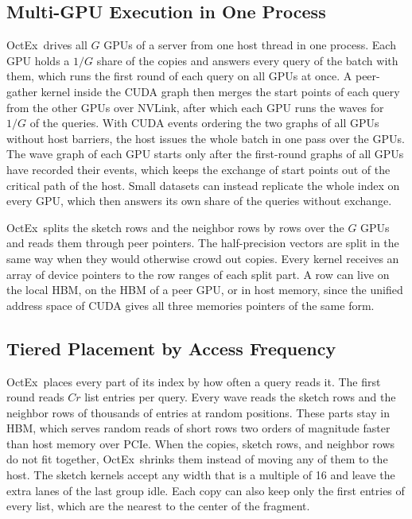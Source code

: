 \documentclass[letterpaper,twocolumn,10pt]{article}
\newcommand{\sysname}{OctEx}
\begin{document}
\subsection{Multi-GPU Execution in One Process}
\label{sec:multigpu}

\sysname\ drives all $G$ GPUs of a server from one host thread in one process. Each GPU holds a $1/G$ share of the copies and answers every query of the batch with them, which runs the first round of each query on all GPUs at once. A peer-gather kernel inside the CUDA graph then merges the start points of each query from the other GPUs over NVLink, after which each GPU runs the waves for $1/G$ of the queries. With CUDA events ordering the two graphs of all GPUs without host barriers, the host issues the whole batch in one pass over the GPUs. The wave graph of each GPU starts only after the first-round graphs of all GPUs have recorded their events, which keeps the exchange of start points out of the critical path of the host. Small datasets can instead replicate the whole index on every GPU, which then answers its own share of the queries without exchange.

\sysname\ splits the sketch rows and the neighbor rows by rows over the $G$ GPUs and reads them through peer pointers. The half-precision vectors are split in the same way when they would otherwise crowd out copies. Every kernel receives an array of device pointers to the row ranges of each split part. A row can live on the local HBM, on the HBM of a peer GPU, or in host memory, since the unified address space of CUDA gives all three memories pointers of the same form.

\subsection{Tiered Placement by Access Frequency}
\label{sec:tiers}

\sysname\ places every part of its index by how often a query reads it. The first round reads $C r$ list entries per query. Every wave reads the sketch rows and the neighbor rows of thousands of entries at random positions. These parts stay in HBM, which serves random reads of short rows two orders of magnitude faster than host memory over PCIe. When the copies, sketch rows, and neighbor rows do not fit together, \sysname\ shrinks them instead of moving any of them to the host. The sketch kernels accept any width that is a multiple of 16 and leave the extra lanes of the last group idle. Each copy can also keep only the first entries of every list, which are the nearest to the center of the fragment.
\end{document}

